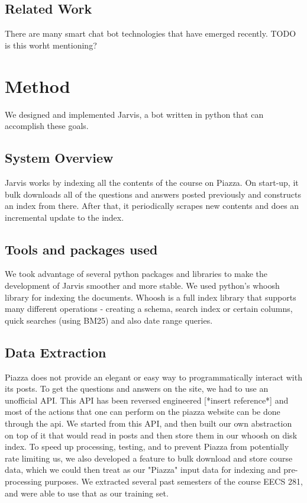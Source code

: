 \documentclass[sigconf]{acmart}
\begin{document}
\subsection{Related Work}
There are many smart chat bot technologies that have emerged recently. TODO is this worht mentioning?

\section{Method}
We designed and implemented Jarvis, a bot written in python that can accomplish these goals. 

\subsection{System Overview}
Jarvis works by indexing all the contents of the course on Piazza. On start-up, it bulk downloads all of the questions and answers posted previously and constructs an index from there. After that, it periodically scrapes new contents and does an incremental update to the index.

\subsection{Tools and packages used}
We took advantage of several python packages and libraries to make the development of Jarvis smoother and more stable. We used python's whoosh library for indexing the documents. Whoosh is a full index library that supports many different operations - creating a schema, search index or certain columns, quick searches (using BM25) and also date range queries. 

\subsection{Data Extraction}
Piazza does not provide an elegant or easy way to programmatically interact with its posts. To get the questions and answers on the site, we had to use an unofficial API. This API has been reversed engineered [*insert reference*] and most of the actions that one can perform on the piazza website can be done through the api. We started from this API, and then built our own abstraction on top of it that would read in posts and then store them in our whoosh on disk index. To speed up processing, testing, and to prevent Piazza from potentially rate limiting us, we also developed a feature to bulk download and store course data, which we could then treat as our "Piazza" input data for indexing and pre-processing purposes. We extracted several past semesters of the course EECS 281, and were able to use that as our training set.
\end{document}
